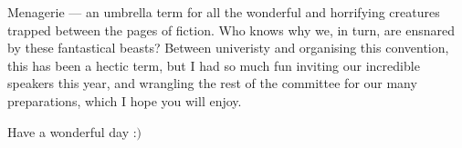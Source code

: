 Menagerie --- an umbrella term for all the wonderful and horrifying creatures trapped between the pages of fiction. Who knows why we, in turn, are ensnared by these fantastical beasts? Between univeristy and organising this convention, this has been a hectic term, but I had so much fun inviting our incredible speakers this year, and wrangling the rest of the committee for our many preparations, which I hope you will enjoy.

Have a wonderful day :$)$